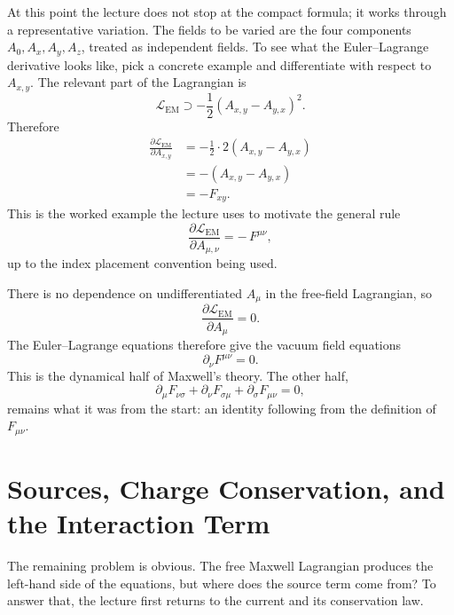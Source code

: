 At this point the lecture does not stop at the compact formula; it works through a representative variation. The fields to be varied are the four components \(A_0,A_x,A_y,A_z\), treated as independent fields. To see what the Euler--Lagrange derivative looks like, pick a concrete example and differentiate with respect to \(A_{x,y}\). The relevant part of the Lagrangian is
\begin{equation}
\mathcal L_{\mathrm{EM}}
\supset
-\frac12\left(A_{x,y}-A_{y,x}\right)^2.
\end{equation}
Therefore
\begin{align}
\frac{\partial \mathcal L_{\mathrm{EM}}}{\partial A_{x,y}}
&=
-\frac12\cdot 2\left(A_{x,y}-A_{y,x}\right)
\\
&=
-\left(A_{x,y}-A_{y,x}\right)
\\
&=
-F_{xy}.
\end{align}
This is the worked example the lecture uses to motivate the general rule
\begin{equation}
\frac{\partial \mathcal L_{\mathrm{EM}}}{\partial A_{\mu,\nu}}
=
-\,F^{\mu\nu},
\end{equation}
up to the index placement convention being used.

There is no dependence on undifferentiated \(A_\mu\) in the free-field Lagrangian, so
\begin{equation}
\frac{\partial \mathcal L_{\mathrm{EM}}}{\partial A_\mu}=0.
\end{equation}
The Euler--Lagrange equations therefore give the vacuum field equations
\begin{equation}
\partial_\nu F^{\mu\nu}=0.
\end{equation}
This is the dynamical half of Maxwell's theory. The other half,
\begin{equation}
\partial_\mu F_{\nu\sigma}
+\partial_\nu F_{\sigma\mu}
+\partial_\sigma F_{\mu\nu}=0,
\end{equation}
remains what it was from the start: an identity following from the definition of \(F_{\mu\nu}\).

\section{Sources, Charge Conservation, and the Interaction Term}

The remaining problem is obvious. The free Maxwell Lagrangian produces the left-hand side of the equations, but where does the source term come from? To answer that, the lecture first returns to the current and its conservation law.

